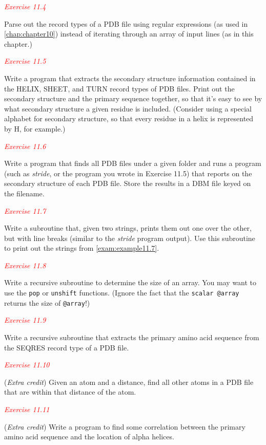 \textcolor{red}{\textit{Exercise 11.4}}
\begin{adjustwidth}{2em}{}
Parse out the record types of a PDB file using regular expressions (as used in \autoref{chap:chapter10}) instead of iterating through an array of input lines (as in this chapter.) 
\end{adjustwidth}

\textcolor{red}{\textit{Exercise 11.5}}
\begin{adjustwidth}{2em}{}
Write a program that extracts the secondary structure information contained in the HELIX, SHEET, and TURN record types of PDB files. Print out the secondary structure and the primary sequence together, so that it's easy to see by what secondary structure a given residue is included. (Consider using a special alphabet for secondary structure, so that every residue in a helix is represented by H, for example.)
\end{adjustwidth}

\textcolor{red}{\textit{Exercise 11.6}}
\begin{adjustwidth}{2em}{}
Write a program that finds all PDB files under a given folder and runs a program (such as \textit{stride}, or the program you wrote in Exercise 11.5) that reports on the secondary structure of each PDB file. Store the results in a DBM file keyed on the filename.
\end{adjustwidth}

\textcolor{red}{\textit{Exercise 11.7}}
\begin{adjustwidth}{2em}{}
Write a subroutine that, given two strings, prints them out one over the other, but with line breaks (similar to the \textit{stride} program output). Use this subroutine to print out the strings from \autoref{exam:example11.7}. 
\end{adjustwidth}

\textcolor{red}{\textit{Exercise 11.8}}
\begin{adjustwidth}{2em}{}
Write a recursive subroutine to determine the size of an array. You may want to use the \verb|pop| or \verb|unshift| functions. (Ignore the fact that the \verb|scalar @array| returns the size of \verb|@array|!)
\end{adjustwidth}

\textcolor{red}{\textit{Exercise 11.9}}
\begin{adjustwidth}{2em}{}
Write a recursive subroutine that extracts the primary amino acid sequence from the SEQRES record type of a PDB file. 
\end{adjustwidth}

\textcolor{red}{\textit{Exercise 11.10}}
\begin{adjustwidth}{2em}{}
(\textit{Extra credit}) Given an atom and a distance, find all other atoms in a PDB file that are within that distance of the atom. 
\end{adjustwidth}

\textcolor{red}{\textit{Exercise 11.11}}
\begin{adjustwidth}{2em}{}
(\textit{Extra credit}) Write a program to find some correlation between the primary amino acid sequence and the location of alpha helices. 
\end{adjustwidth}

